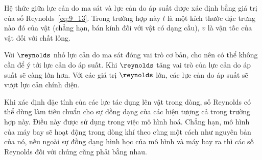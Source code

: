 
Hệ thức giữa lực cản do ma sát và lực cản do áp suất dược xác định bằng giá trị của số Reynolds~\eqref{eq:9_13}. Trong trường hợp này $l$ là một kích thước đặc trưng nào đó của vật (chẳng hạn, bán kính đối với vật có dạng cầu), $v$ là vận tốc của vật đối với chất lỏng.


Với $\reynolds$ nhỏ lực cản do ma sát đóng vai trò cơ bản, cho nên có thể không cần để ý tới lực cản do áp suất. Khi $\reynolds$ tăng vai trò của lực cản do áp suất sẽ càng lớn hơn. Với các giá trị $\reynolds$ lớn, các lực cản do áp suất sẽ vượt lực cản chính diện.


Khi xác định đặc tính của các lực tác dụng lên vật trong dòng, số Reynolds có thể dùng làm tiêu chuẩn cho sự dồng dạng của các hiện tượng cả trong trường hợp này. Điều này được sử dụng trong việc mô hình hoá. Chẳng hạn, mô hình của máy bay sẽ hoạt động trong dòng khí theo cùng một cách như nguyên bản của nó, nếu ngoài sự đồng dạng hình học của mô hình và máy bay ra thì các số Reynolds đối với chúng cũng phải bằng nhau.


